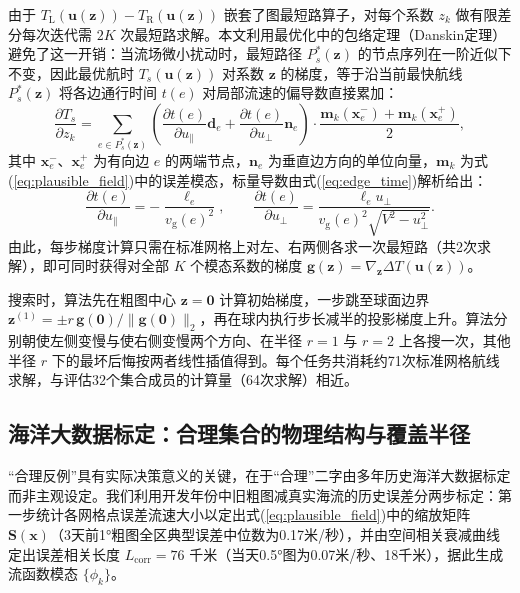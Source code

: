 由于 $T_{\text{L}}(\boldsymbol{u}(\boldsymbol{z})) - T_{\text{R}}(\boldsymbol{u}(\boldsymbol{z}))$ 嵌套了图最短路算子，对每个系数 $z_k$ 做有限差分每次迭代需 $2K$ 次最短路求解。本文利用最优化中的包络定理（Danskin定理）避免了这一开销：当流场微小扰动时，最短路径 $P_s^*(\boldsymbol{z})$ 的节点序列在一阶近似下不变，因此最优航时 $T_s(\boldsymbol{u}(\boldsymbol{z}))$ 对系数 $\boldsymbol{z}$ 的梯度，等于沿当前最快航线 $P_s^*(\boldsymbol{z})$ 将各边通行时间 $t(e)$ 对局部流速的偏导数直接累加：
\begin{equation}
\frac{\partial T_s}{\partial z_k} = \sum_{e \in P_s^*(\boldsymbol{z})} \left( \frac{\partial t(e)}{\partial u_{\parallel}} \boldsymbol{d}_e + \frac{\partial t(e)}{\partial u_{\perp}} \boldsymbol{n}_e \right) \cdot \frac{\boldsymbol{m}_k(\boldsymbol{x}_e^{-}) + \boldsymbol{m}_k(\boldsymbol{x}_e^{+})}{2},
\label{eq:envelope_grad}
\end{equation}
其中 $\boldsymbol{x}_e^{-}$、$\boldsymbol{x}_e^{+}$ 为有向边 $e$ 的两端节点，$\boldsymbol{n}_e$ 为垂直边方向的单位向量，$\boldsymbol{m}_k$ 为式(\ref{eq:plausible_field})中的误差模态，标量导数由式(\ref{eq:edge_time})解析给出：
\begin{equation}
\frac{\partial t(e)}{\partial u_{\parallel}} = -\frac{\ell_e}{v_{\text{g}}(e)^2}, \qquad \frac{\partial t(e)}{\partial u_{\perp}} = \frac{\ell_e u_{\perp}}{v_{\text{g}}(e)^2 \sqrt{V^2 - u_{\perp}^2}}.
\label{eq:edge_deriv}
\end{equation}
由此，每步梯度计算只需在标准网格上对左、右两侧各求一次最短路（共2次求解），即可同时获得对全部 $K$ 个模态系数的梯度 $\boldsymbol{g}(\boldsymbol{z}) = \nabla_{\boldsymbol{z}} \Delta T(\boldsymbol{u}(\boldsymbol{z}))$。

搜索时，算法先在粗图中心 $\boldsymbol{z}=\boldsymbol{0}$ 计算初始梯度，一步跳至球面边界 $\boldsymbol{z}^{(1)} = \pm r\, \boldsymbol{g}(\boldsymbol{0}) / \|\boldsymbol{g}(\boldsymbol{0})\|_2$，再在球内执行步长减半的投影梯度上升。算法分别朝使左侧变慢与使右侧变慢两个方向、在半径 $r=1$ 与 $r=2$ 上各搜一次，其他半径 $r$ 下的最坏后悔按两者线性插值得到。每个任务共消耗约71次标准网格航线求解，与评估32个集合成员的计算量（64次求解）相近。

\subsection{海洋大数据标定：合理集合的物理结构与覆盖半径}
“合理反例”具有实际决策意义的关键，在于“合理”二字由多年历史海洋大数据标定而非主观设定\cite{benhaim2006infogap}。我们利用开发年份中旧粗图减真实海流的历史误差分两步标定：第一步统计各网格点误差流速大小以定出式(\ref{eq:plausible_field})中的缩放矩阵 $\mathbf{S}(\boldsymbol{x})$（3天前1°粗图全区典型误差中位数为0.17米/秒），并由空间相关衰减曲线定出误差相关长度 $L_{\text{corr}} = 76$ 千米（当天0.5°图为0.07米/秒、18千米），据此生成流函数模态 $\{\phi_k\}$。

